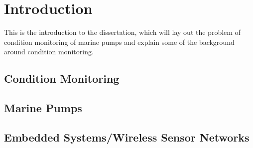 \chapter{Introduction}

This is the introduction to the dissertation, which will lay out the problem of condition monitoring of marine pumps and explain some of the background around condition monitoring.

\section{Condition Monitoring}

\section{Marine Pumps}

\section{Embedded Systems/Wireless Sensor Networks}
